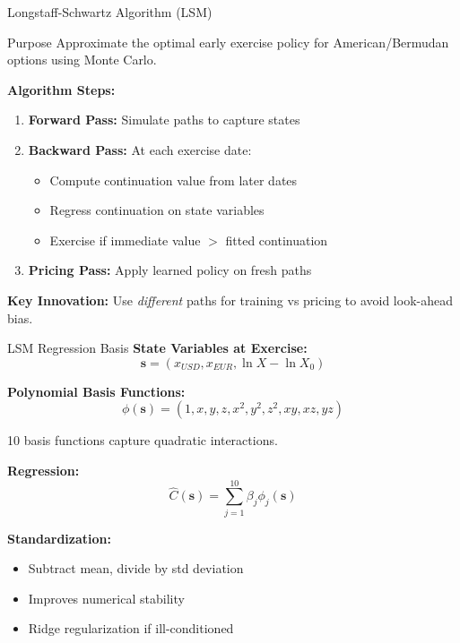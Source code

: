 \documentclass[aspectratio=169,11pt]{beamer}
\begin{document}
\begin{frame}{Longstaff-Schwartz Algorithm (LSM)}
\begin{block}{Purpose}
Approximate the optimal early exercise policy for American/Bermudan options using Monte Carlo.
\end{block}

\textbf{Algorithm Steps:}
\begin{enumerate}
    \item \textbf{Forward Pass:} Simulate paths to capture states
    \item \textbf{Backward Pass:} At each exercise date:
    \begin{itemize}
        \item Compute continuation value from later dates
        \item Regress continuation on state variables
        \item Exercise if immediate value $>$ fitted continuation
    \end{itemize}
    \item \textbf{Pricing Pass:} Apply learned policy on fresh paths
\end{enumerate}

\textbf{Key Innovation:} Use \textit{different} paths for training vs pricing to avoid look-ahead bias.
\end{frame}

\begin{frame}{LSM Regression Basis}
\textbf{State Variables at Exercise:}
\[
\mathbf{s} = (x_{USD}, x_{EUR}, \ln X - \ln X_0)
\]

\textbf{Polynomial Basis Functions:}
\[
\phi(\mathbf{s}) = (1, x, y, z, x^2, y^2, z^2, xy, xz, yz)
\]

10 basis functions capture quadratic interactions.

\textbf{Regression:}
\[
\hat{C}(\mathbf{s}) = \sum_{j=1}^{10} \beta_j \phi_j(\mathbf{s})
\]

\textbf{Standardization:}
\begin{itemize}
    \item Subtract mean, divide by std deviation
    \item Improves numerical stability
    \item Ridge regularization if ill-conditioned
\end{itemize}
\end{frame}
\end{document}
